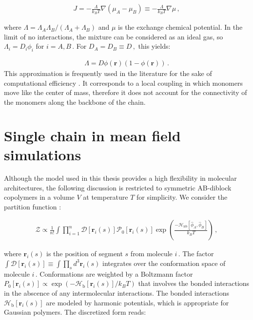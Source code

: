 \documentclass[bachelor,       %
               oneside,        %
               BCOR10mm,       %
               ngerman, english %
               ]{GAUBM}
\begin{document}
\begin{align}
  J=-\frac{\Lambda}{k_BT}\nabla(\mu_A - \mu_B)\equiv -\frac{\Lambda}{k_BT}\nabla\mu\,,
\end{align}

where $\Lambda=\Lambda_A\Lambda_B/(\Lambda_A+\Lambda_B)$ and $\mu$ is the exchange chemical potential. In the limit of no interactions, the mixture can be considered as an ideal gas, so $\Lambda_i=D_i\phi_i$ for $i=A, B\,.$ For $D_A=D_B\equiv D\,,$ this yields:

\begin{align}
  \Lambda=D\phi(\mathbf{r})(1-\phi(\mathbf{r}))\,.
  \label{eq:onsager}
\end{align}
This approximation is frequently used in the literature for the sake of computational efficiency \cite{Fraaje97,deGennes80,Binder83}. It corresponds to a local coupling in which monomers move like the center of mass, therefore it does not account for the connectivity of the monomers along the backbone of the chain. 

\section{Single chain in mean field simulations}



Although the model used in this thesis provides a high flexibility in molecular architectures, the following discussion is restricted to symmetric  AB-diblock copolymers in a volume $V$ at temperature $T$ for simplicity. We consider the partition function \cite{Daoulas06}:

\begin{align}
    \mathcal{Z}\propto\frac{1}{n!}\int{\prod_{i=1}^n\mathcal{D}[\mathbf r_i(s)]\mathcal P_0[\mathbf r_i(s)]\exp\left(\frac{-\mathcal H_{\text{nb}}[\hat\phi_A,\hat\phi_B]}{k_BT}\right)}\,,
    \label{eq:partition_punction}
\end{align}

where $\mathbf r_i(s)$ is the position of segment $s$ from molecule $i\,.$ The factor $\int\mathcal{D}[\mathbf r_i(s)]\equiv \int\prod_sd^3\mathbf r_i(s)$ integrates over the conformation space of molecule $i\,.$ Conformations are weighted by a Boltzmann factor $P_0[\mathbf r_i(s)]\propto\exp\left(-\mathcal H_{\text{b}}[\mathbf r_i(s)]/k_BT\right)$ that involves the bonded interactions in the abscence of any intermolecular interactions. The bonded interactions $\mathcal H_{\text{b}}[\mathbf r_i(s)]$ are modeled by harmonic potentials, which is appropriate for Gaussian polymers. The discretized form reads:
\end{document}

